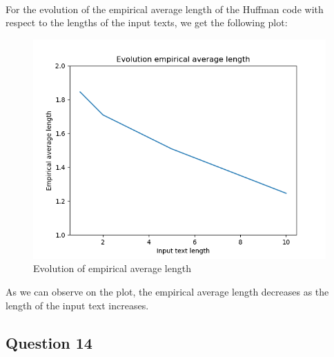 \documentclass[a4paper, 11pt, oneside]{article}
\begin{document}
\paragraph{}For the evolution of the empirical average length of the Huffman code with respect to the lengths of the input texts, we get the following plot:
\begin{figure}[H]
    \centering
    \includegraphics[scale=0.5]{q7.png}
    \caption{Evolution of empirical average length}
\end{figure}
As we can observe on the plot, the empirical average length decreases as the length of the input text increases.

\subsection{Question 14}
\end{document}
